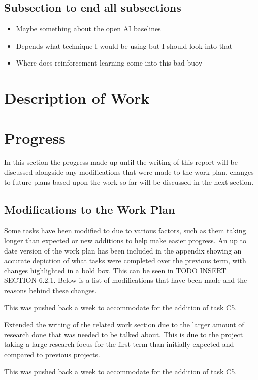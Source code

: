 \documentclass[a4paper]{article}
\begin{document}
\subsection{Subsection to end all subsections}
\begin{itemize}
    \item Maybe something about the open AI baselines
    \item Depends what technique I would be using but I should look into that
    \item Where does reinforcement learning come into this bad buoy
\end{itemize}

\section{Description of Work}

\section{Progress}
In this section the progress made up until the writing of this report will be discussed alongside any modifications that were made to the work plan, changes to future plans based upon the work so far will be discussed in the next section.
\subsection{Modifications to the Work Plan}
Some tasks have been modified to due to various factors, such as them taking longer than expected or new additions to help make easier progress.
An up to date version of the work plan has been included in the appendix showing an accurate depiction of what tasks were completed over the previous term, with changes highlighted in a bold box.
This can be seen in TODO INSERT SECTION 6.2.1.
Below is a list of modifications that have been made and the reasons behind these changes.
\begin{description}
\setlength{\itemsep}{0pt}
\setlength{\parskip}{0pt}
\item [\large{Documentation}]
\item [D4--Interim Report Outline Sections]
This was pushed back a week to accommodate for the addition of task C5.
\item [D5--Interim Report Related Work]
Extended the writing of the related work section due to the larger amount of research done that was needed to be talked about.
This is due to the project taking a large research focus for the first term than initially expected and compared to previous projects.
\item [D6--Interim Report Draft]
This was pushed back a week to accommodate for the addition of task C5.
\end{description}
\end{document}
